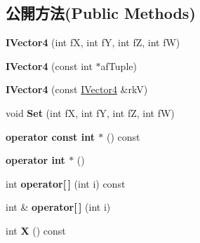 \subsection*{公開方法(Public Methods)}
\begin{DoxyCompactItemize}
\item 
{\bfseries I\+Vector4} (int fX, int fY, int fZ, int fW)\hypertarget{class_magnum_1_1_i_vector4_a6d9b3feb4b5ba4e287d8f005af8316c5}{}\label{class_magnum_1_1_i_vector4_a6d9b3feb4b5ba4e287d8f005af8316c5}

\item 
{\bfseries I\+Vector4} (const int $\ast$af\+Tuple)\hypertarget{class_magnum_1_1_i_vector4_adc5fa1fcae6a38bb1fd209f75dbe1bb0}{}\label{class_magnum_1_1_i_vector4_adc5fa1fcae6a38bb1fd209f75dbe1bb0}

\item 
{\bfseries I\+Vector4} (const \hyperlink{class_magnum_1_1_i_vector4}{I\+Vector4} \&rkV)\hypertarget{class_magnum_1_1_i_vector4_a8ecf93a17161d81416ce0330c0f61104}{}\label{class_magnum_1_1_i_vector4_a8ecf93a17161d81416ce0330c0f61104}

\item 
void {\bfseries Set} (int fX, int fY, int fZ, int fW)\hypertarget{class_magnum_1_1_i_vector4_aed071e0f00187b9740b97b6340aa447f}{}\label{class_magnum_1_1_i_vector4_aed071e0f00187b9740b97b6340aa447f}

\item 
{\bfseries operator const int $\ast$} () const \hypertarget{class_magnum_1_1_i_vector4_a90ee8d2e58c7eeae1c2e58047afcffcb}{}\label{class_magnum_1_1_i_vector4_a90ee8d2e58c7eeae1c2e58047afcffcb}

\item 
{\bfseries operator int $\ast$} ()\hypertarget{class_magnum_1_1_i_vector4_a2e6c3b0fccca033e9cff1e188c142fb4}{}\label{class_magnum_1_1_i_vector4_a2e6c3b0fccca033e9cff1e188c142fb4}

\item 
int {\bfseries operator\mbox{[}$\,$\mbox{]}} (int i) const \hypertarget{class_magnum_1_1_i_vector4_a8442ad4fc92663d07c1c9e5ebfd904dd}{}\label{class_magnum_1_1_i_vector4_a8442ad4fc92663d07c1c9e5ebfd904dd}

\item 
int \& {\bfseries operator\mbox{[}$\,$\mbox{]}} (int i)\hypertarget{class_magnum_1_1_i_vector4_ad8b14cfd1d022363abfdf7665750d552}{}\label{class_magnum_1_1_i_vector4_ad8b14cfd1d022363abfdf7665750d552}

\item 
int {\bfseries X} () const \hypertarget{class_magnum_1_1_i_vector4_a7d3400b810b64a6dea1aa541e99a1778}{}\label{class_magnum_1_1_i_vector4_a7d3400b810b64a6dea1aa541e99a1778}


\end{DoxyCompactItemize}
